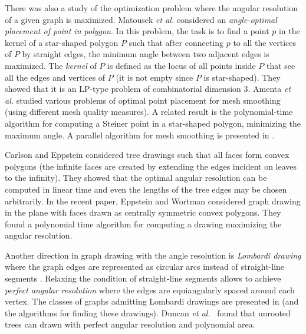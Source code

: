 \documentclass[10pt]{article}
\newcommand{\etal}{\textit{et al.}}
\begin{document}
There was also a study of the optimization problem where the angular resolution of a given graph is maximized.
Matousek \etal \cite{msw-96} considered an {\em angle-optimal placement of point in polygon}. In this problem,  the task is to find a point $p$ in the kernel of a star-shaped polygon $P$ such that after connecting $p$ to all the vertices of $P$ by straight edges, the minimum angle 
between two adjacent edges is maximized. The {\em kernel} of $P$  is defined as the locus of 
all points inside $P$ that see all the edges and vertices of $P$ (it is not empty since $P$ is star-shaped). They showed that it is an LP-type problem of combinatorial dimension 3.
Amenta \etal \cite{abe-99} studied various problems of optimal point placement for mesh smoothing (using different mesh quality measures). A related result is the polynomial-time 
algorithm for computing a Steiner point in a star-shaped polygon, minimizing 
the maximum angle. A parallel algorithm for mesh smoothing is presented in 
\cite{mesh1}.


Carlson and Eppstein \cite{ce-tcf-06} considered tree drawings such that  all faces form  convex polygons (the infinite faces are created by extending the edges incident on leaves to the infinity). They showed that the optimal angular resolution can be computed in linear time and even the lengths of the tree edges may be chosen arbitrarily.
In the recent paper, Eppstein and Wortman \cite{ew-oar-11} considered 
graph drawing in the plane with faces drawn as centrally symmetric convex polygons. 
They found a polynomial time algorithm for computing a drawing maximizing the angular resolution. 

Another direction in graph drawing with the angle resolution is {\em  Lombardi drawing} where 
the graph edges are represented as circular arcs instead of straight-line segments 
\cite{ccgkt-11,degkn-10,degkn-12}.
Relaxing  the condition of straight-line segments allows to achieve {\em perfect angular resolution} where the edges are equiangularly spaced around each vertex. 
The classes of graphs admitting Lombardi drawings are presented in \cite{degkn-12} (and the algorithms for finding these drawings). 
Duncan \etal~\cite{degkn-10} found  that unrooted trees can drawn with perfect angular resolution and polynomial area.
\end{document}
